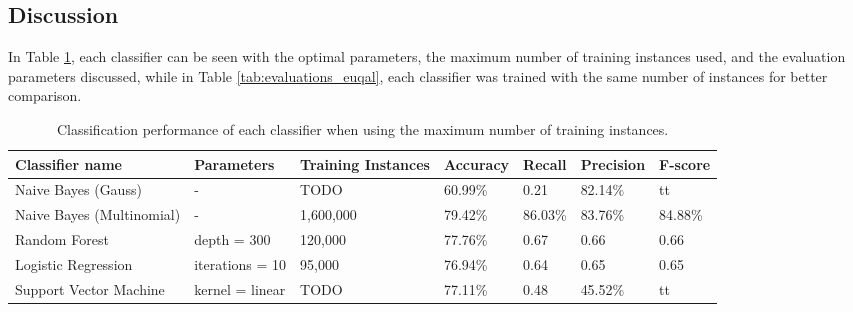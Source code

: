 \subsection{Discussion}
In Table \ref{tab:evaluations_max}, each classifier can be seen with the optimal parameters, the maximum number of training instances used, and the evaluation parameters discussed, while in Table \ref{tab:evaluations_euqal}, each classifier was trained with the same number of instances for better comparison.
\begin{table}[]
\centering
\caption{Classification performance of each classifier when using the maximum number of training instances.}
\begin{tabular}{ |p{3cm}||p{3cm}|p{2cm}|p{1.5cm}|p{1.5cm}|p{1.5cm}|p{1.5cm}| }
 \hline
 Classifier name &          Parameters &             Training Instances &    Accuracy &      Recall &     Precision& F-score \\
 \hline
 Naive Bayes (Gauss)        &-&            TODO&                 60.99\%&        0.21&       82.14\%& tt\\
  \hline
 Naive Bayes (Multinomial)  &-&                     1,600,000&                79.42\%&        86.03\%&       83.76\%& 84.88\%\\
  \hline
 Random Forest              &depth = 300&            120,000&                 77.76\%&        0.67&       0.66& 0.66\\
  \hline
 Logistic Regression        &iterations = 10&            95,000&                 76.94\%&        0.64&       0.65& 0.65\\
  \hline
 Support Vector Machine     &kernel = linear&            TODO&                 77.11\%&        0.48&       45.52\%& tt\\
 \hline
\end{tabular}
\label{tab:evaluations_max}
\end{table}


